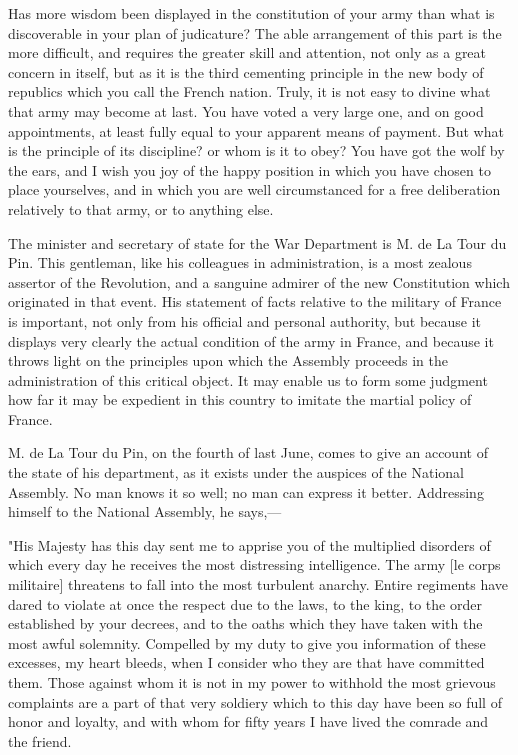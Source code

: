 Has more wisdom been displayed in the constitution of your army than what is discoverable in your plan of judicature? The able arrangement of this part is the more difficult, and requires the greater skill and attention, not only as a great concern in itself, but as it is the third cementing principle in the new body of republics which you call the French nation. Truly, it is not easy to divine what that army may become at last. You have voted a very large one, and on good appointments, at least fully equal to your apparent means of payment. But what is the principle of its discipline? or whom is it to obey? You have got the wolf by the ears, and I wish you joy of the happy position in which you have chosen to place yourselves, and in which you are well circumstanced for a free deliberation relatively to that army, or to anything else.

The minister and secretary of state for the War Department is M. de La Tour du Pin. This gentleman, like his colleagues in administration, is a most zealous assertor of the Revolution, and a sanguine admirer of the new Constitution which originated in that event. His statement of facts relative to the military of France is important, not only from his official and personal authority, but because it displays very clearly the actual condition of the army in France, and because it throws light on the principles upon which the Assembly proceeds in the administration of this critical object. It may enable us to form some judgment how far it may be expedient in this country to imitate the martial policy of France.

M. de La Tour du Pin, on the fourth of last June, comes to give an account of the state of his department, as it exists under the auspices of the National Assembly. No man knows it so well; no man can express it better. Addressing himself to the National Assembly, he says,—

"His Majesty has this day sent me to apprise you of the multiplied disorders of which every day he receives the most distressing intelligence. The army [le corps militaire] threatens to fall into the most turbulent anarchy. Entire regiments have dared to violate at once the respect due to the laws, to the king, to the order established by your decrees, and to the oaths which they have taken with the most awful solemnity. Compelled by my duty to give you information of these excesses, my heart bleeds, when I consider who they are that have committed them. Those against whom it is not in my power to withhold the most grievous complaints are a part of that very soldiery which to this day have been so full of honor and loyalty, and with whom for fifty years I have lived the comrade and the friend.

